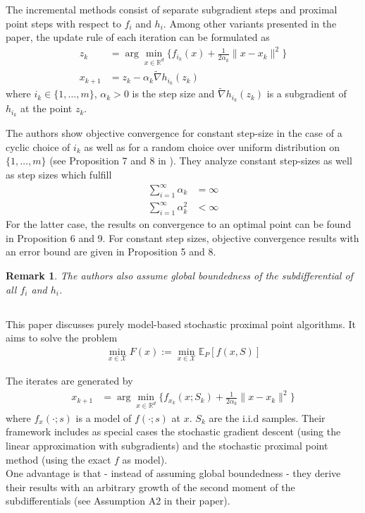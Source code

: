 \documentclass[12pt,a4paper,twoside]{article}
\theoremstyle{plain}
\newtheorem{rem}[thm]{Remark}
\theoremstyle{note}
\numberwithin{thm}{section}
\begin{document}
	The incremental methods consist of separate subgradient steps and proximal point steps with respect to $f_i$ and $h_i$. Among other variants presented in the paper, the update rule of each iteration can be formulated as
	\begin{align*}
		z_k &= \arg \min_{x \in \mathbb{R}^d} \{f_{i_k}(x) + \frac{1}{2\alpha_k} \|x - x_k\|^2\} \\
		x_{k+1} &= z_k - \alpha_k \tilde{\nabla} h_{i_k}(z_k)
	\end{align*}
	where $i_k \in \{1,\dots,m\}$, $\alpha_k > 0$ is the step size and $\tilde{\nabla}h_{i_k}(z_k)$ is a subgradient of $h_{i_k}$ at the point $z_k$.
	
	The authors show objective convergence for constant step-size in the case of a cyclic choice of $i_k$ as well as for a random choice over uniform distribution on $\{1,\dots,m\}$ (see Proposition 7 and 8 in \cite{Bertsekas2011}). They analyze constant step-sizes as well as step sizes which fulfill
	\begin{align*}
		\sum_{i=1}^{\infty} \alpha_k &= \infty \\
		\sum_{i=1}^{\infty} \alpha_k^2 &< \infty 
	\end{align*}
	For the latter case, the results on convergence to an optimal point can be found in Proposition 6 and 9. For constant step sizes, objective convergence results with an error bound are given in Proposition 5 and 8.
	\begin{rem}
		The authors also assume global boundedness of the subdifferential of all $f_i$ and $h_i$.
	\end{rem}
	
	
	\subsection{\cite{Asi2019}}
	This paper discusses purely model-based stochastic proximal point algorithms. It aims to solve the problem
	\begin{align*}
		\min_{x \in \mathcal{X}} F(x) := \min_{x \in \mathcal{X}} \mathbb{E}_P[f(x,S)]
	\end{align*}
	
	The iterates are generated by
	\begin{align*}
		x_{k+1} &= \arg \min_{x \in \mathbb{R}^d} \{f_{x_k}(x;S_k) + \frac{1}{2\alpha_k} \|x - x_k\|^2\}
	\end{align*}
	where $f_{x}(\cdot;s)$ is a model of $f(\cdot;s)$ at $x$. $S_k$ are the i.i.d samples. Their framework includes as special cases the stochastic gradient descent (using the linear approximation with subgradients) and the stochastic proximal point method (using the exact $f$ as model).\\
	One advantage is that - instead of assuming global boundedness - they derive their results with an arbitrary growth of the second moment of the subdifferentials (see Assumption A2 in their paper).\\
	
\end{document}
